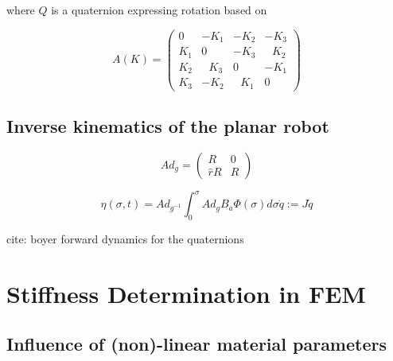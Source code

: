 where $Q$ is a quaternion expressing rotation based on 




\begin{equation}
    A(K) = \begin{pmatrix} 0 & -K_1 & -K_2 & -K_3 \\ K_1 & 0 & -K_3 & \hspace{8pt}K_2 \\ K_2 & \hspace{8pt}K_3 & 0 & -K_1 \\ K_3 & -K_2 & \hspace{8pt}K_1 & 0 \end{pmatrix}
\end{equation}


\subsection{Inverse kinematics of the planar robot}


\begin{equation}
    Ad_g = \begin{pmatrix} R & 0 \\ \hat{r}R & R \end{pmatrix}
\end{equation}

\begin{equation}
\eta(\sigma,t) = Ad_{g^{-1}} \int_{0}^{\sigma} Ad_g B_a \Phi(\sigma) d\sigma \dot{q} := J\dot{q}
\end{equation}



cite: boyer forward dynamics for the quaternions


















\section{Stiffness Determination in FEM}








\subsection{Influence of (non)-linear material parameters}


